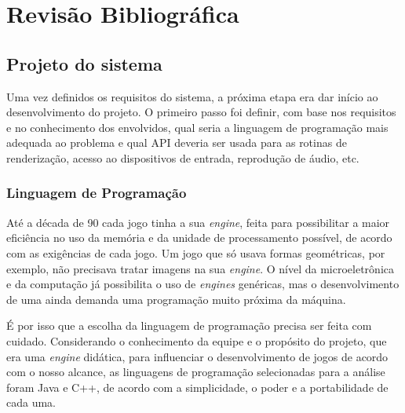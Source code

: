 \chapter{Revisão Bibliográfica}
\label{cap:revisao_bibliografica}
%
%
\section{Projeto do sistema}
%
Uma vez definidos os requisitos do sistema, a próxima etapa era dar início ao desenvolvimento do projeto. O primeiro passo foi definir, com base nos requisitos e no conhecimento dos envolvidos, qual seria a linguagem de programação mais adequada ao problema e qual API deveria ser usada para as rotinas de renderização, acesso ao dispositivos de entrada, reprodução de áudio, etc.
%
%
\subsection{Linguagem de Programação}
\label{linguagem}
%
Até a década de 90 cada jogo tinha a sua \textit{engine}, feita para possibilitar a maior eficiência no uso da memória e da unidade de processamento possível, de acordo com as exigências de cada jogo. Um jogo que só usava formas geométricas, por exemplo, não precisava tratar imagens na sua \textit{engine}. O nível da microeletrônica e da computação já possibilita o uso de \textit{engines} genéricas, mas o desenvolvimento de uma ainda demanda uma programação muito próxima da máquina. 
\par
É por isso que a escolha da linguagem de programação precisa ser feita com cuidado. Considerando o conhecimento da equipe e o propósito do projeto, que era uma \textit{engine} didática, para influenciar o desenvolvimento de jogos de acordo com o nosso alcance, as linguagens de programação selecionadas para a análise foram Java e C++, de acordo com a simplicidade, o poder e a portabilidade de cada uma.
%
